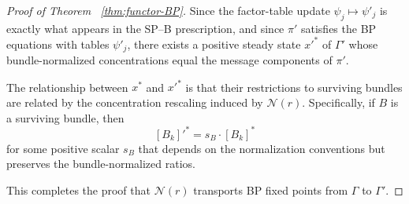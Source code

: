 \documentclass{article}
\theoremstyle{plain}
\theoremstyle{definition}
\theoremstyle{remark}
\newcommand{\<}{\langle}
\renewcommand{\>}{\rangle}
\begin{document}
\begin{proof}[Proof of Theorem ~\ref{thm:functor-BP}]
Since the factor-table update $\psi_j \mapsto \psi'_j$ is exactly what appears in the 
SP--B prescription, and since $\pi'$ satisfies the BP equations with tables $\psi'_j$, 
there exists a positive steady state $x'^*$ of $\Gamma'$ whose bundle-normalized 
concentrations equal the message components of $\pi'$.

The relationship between $x^*$ and $x'^*$ is that their restrictions to surviving 
bundles are related by the concentration rescaling induced by $\mathcal{N}(r)$. 
Specifically, if $B$ is a surviving bundle, then
\[
[B_k]'^* = s_B \cdot [B_k]^*
\]
for some positive scalar $s_B$ that depends on the normalization conventions but 
preserves the bundle-normalized ratios.

This completes the proof that $\mathcal{N}(r)$ transports BP fixed points 
from $\Gamma$ to $\Gamma'$.
\end{proof}
\end{document}
